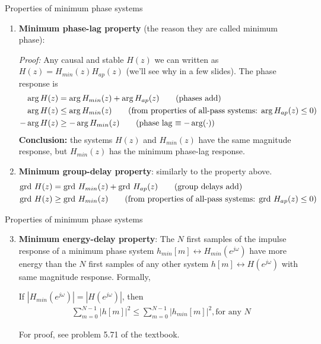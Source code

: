 \documentclass[10pt, aspectratio=169]{beamer}
\begin{document}
\begin{frame}{Properties of minimum phase systems}
\begin{enumerate}
	\item \textbf{Minimum phase-lag property} (the reason they are called minimum phase):
	
	\textit{Proof:}
	Any causal and stable $H(z)$ we can written as $H(z) = H_{min}(z)H_{ap}(z)$ (we'll see why in a few slides). The phase response is
	\begin{align*}
	\arg H(z) &= \arg H_{min}(z) + \arg H_{ap}(z) \tag{phases add} \\
	\arg H(z) &\leq \arg H_{min}(z) \tag{from properties of all-pass systems: $\arg H_{ap}(z) \leq 0$} \\
	-\arg H(z) &\geq -\arg H_{min}(z) \tag{phase lag $\equiv -\arg(\cdot)$}
	\end{align*} 
	\pause
	\textbf{Conclusion:} the systems $H(z)$ and $H_{min}(z)$ have the same magnitude response, but $H_{min}(z)$ has the minimum phase-lag response.
	\pause
	\item \textbf{Minimum group-delay property}: similarly to the property above. 
	\begin{align*}
	\mathrm{grd}~H(z) &= \mathrm{grd}~  H_{min}(z) + \mathrm{grd}~  H_{ap}(z) \tag{group delays add} \\
	\mathrm{grd}~  H(z) &\geq \mathrm{grd}~  H_{min}(z) \tag{from properties of all-pass systems: $\mathrm{grd}~  H_{ap}(z) \leq 0$}
	\end{align*} 
\end{enumerate}

\end{frame}


\begin{frame}{Properties of minimum phase systems}
\begin{enumerate}\setcounter{enumi}{2}
\item \textbf{Minimum energy-delay property}: The $N$ first samples of the impulse response of a minimum phase system $h_{min}[m] \leftrightarrow H_{min}(e^{j\omega})$ have more energy than the $N$ first samples of any other system $h[m]\leftrightarrow H(e^{j\omega})$ with same magnitude response. Formally,

If $|H_{min}(e^{j\omega})| = |H(e^{j\omega})|$, then
\begin{align*}
\sum_{m = 0}^{N-1} |h[m]|^2 \leq \sum_{m = 0}^{N-1} |h_{min}[m]|^2, \text{for any $N$}
\end{align*}

For proof, see problem 5.71 of the textbook.	
\end{enumerate}
\end{frame}
\end{document}
